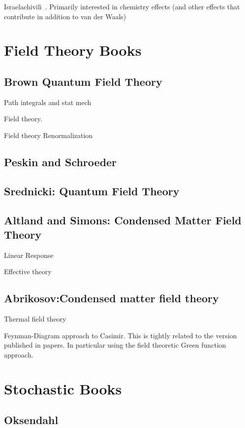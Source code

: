 Israelachivili~\cite{Israelachvili2011}.
Primarily interested in chemistry effects (and other effects that contribute in addition to 
van der Waals)

\section{Field Theory Books}

\subsection{Brown Quantum Field Theory}

\cite{Brown1994}
Path integrals and stat mech

Field theory.  

Field theory Renormalization

\subsection{Peskin and Schroeder}
\cite{Peskin1995}

\subsection{Srednicki: Quantum Field Theory}
\cite{Srednicki2008}

\subsection{Altland and Simons: Condensed Matter Field Theory}
\cite{Altland2011}

Linear Response

Effective theory

\subsection{Abrikosov:Condensed matter field theory}

\cite{Abrikosov1975}
Thermal field theory

Feynman-Diagram approach to Casimir.
This is tightly related to the version published in papers.  In particular using the 
field theoretic Green function approach.  

\section{Stochastic Books}

\subsection{Oksendahl}

